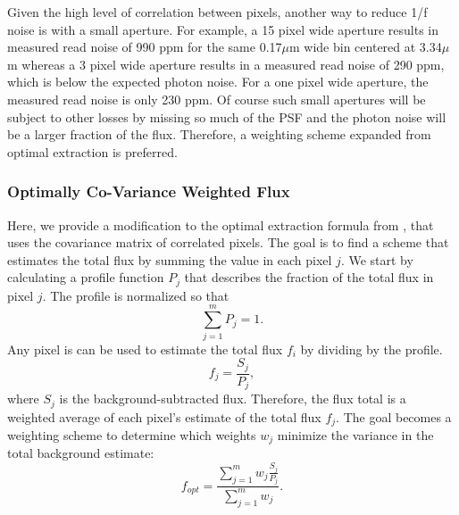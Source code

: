 \documentclass{aastex62}
\begin{document}
Given the high level of correlation between pixels, another way to reduce 1/f noise is with a small aperture.
For example, a 15 pixel wide aperture results in measured read noise of 990 ppm for the same 0.17$\mu$m wide bin centered at 3.34$\mu$m whereas a 3 pixel wide aperture results in a measured read noise of 290 ppm, which is below the expected photon noise.
For a one pixel wide aperture, the measured read noise is only 230 ppm.
Of course such small apertures will be subject to other losses by missing so much of the PSF and the photon noise will be a larger fraction of the flux.
Therefore, a weighting scheme expanded from optimal extraction \citep{horne1986optimalE} is preferred.

\subsubsection{Optimally Co-Variance Weighted Flux}\label{sec:optimalCovWeights}

Here, we provide a modification to the optimal extraction formula from \citet{horne1986optimalE}, that uses the covariance matrix of correlated pixels.
The goal is to find a scheme that estimates the total flux by summing the value in each pixel $j$.
We start by calculating a profile function $P_j$ that describes the fraction of the total flux in pixel $j$.
The profile is normalized so that
\begin{equation}
\sum_{j=1}^{m} P_j = 1.
\end{equation}
Any pixel is can be used to estimate the total flux $f_i$ by dividing by the profile.
\begin{equation}
f_j = \frac{S_j}{P_j},
\end{equation}
where $S_j$ is the background-subtracted flux.
Therefore, the flux total is a weighted average of each pixel's estimate of the total flux $f_j$.
The goal becomes a weighting scheme to determine which weights $w_j$ minimize the variance in the total background estimate:
\begin{equation}
f_{opt} = \frac{\sum_{j=1}^{m} w_j \frac{S_j}{P_j}}{\sum_{j=1}^{m} w_j}.
\end{equation}
\end{document}
